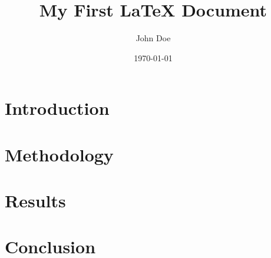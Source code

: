 \documentclass{article}
\title{My First LaTeX Document}
\author{John Doe}
\date{\today}
\begin{document}
\maketitle

\section{Introduction}

\lipsum[1]

\section{Methodology}

\lipsum[2]

\section{Results}

\lipsum[3]

\section{Conclusion}

\lipsum[4]
\end{document}

